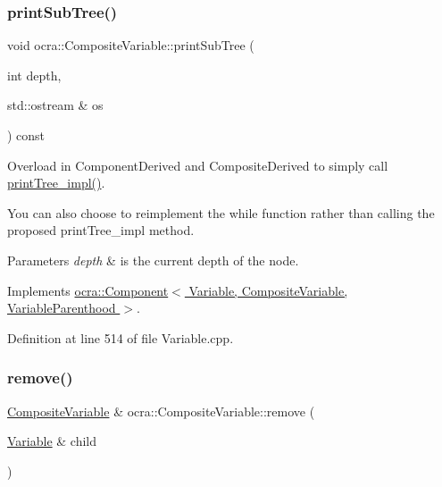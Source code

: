\subsubsection{\texorpdfstring{print\+Sub\+Tree()}{printSubTree()}}
{\footnotesize\ttfamily void ocra\+::\+Composite\+Variable\+::print\+Sub\+Tree (\begin{DoxyParamCaption}\item[{int}]{depth,  }\item[{std\+::ostream \&}]{os }\end{DoxyParamCaption}) const\hspace{0.3cm}{\ttfamily [virtual]}}



Overload in Component\+Derived and Composite\+Derived to simply call \hyperlink{classocra_1_1Composite_a99934c9b17849dd55075c4c773008dae}{print\+Tree\+\_\+impl()}. 

You can also choose to reimplement the while function rather than calling the proposed print\+Tree\+\_\+impl method. 
\begin{DoxyParams}{Parameters}
{\em depth} & is the current depth of the node. \\
\hline
\end{DoxyParams}


Implements \hyperlink{classocra_1_1Component_a3687a02c1524694fc616893264ca8199}{ocra\+::\+Component$<$ Variable, Composite\+Variable, Variable\+Parenthood $>$}.



Definition at line 514 of file Variable.\+cpp.

\hypertarget{classocra_1_1CompositeVariable_ada9e93c4f85c641e2ec8f1152c0b851a}{}\label{classocra_1_1CompositeVariable_ada9e93c4f85c641e2ec8f1152c0b851a} 
\subsubsection{\texorpdfstring{remove()}{remove()}}
{\footnotesize\ttfamily \hyperlink{classocra_1_1CompositeVariable}{Composite\+Variable} \& ocra\+::\+Composite\+Variable\+::remove (\begin{DoxyParamCaption}\item[{\hyperlink{classocra_1_1Variable}{Variable} \&}]{child }\end{DoxyParamCaption})\hspace{0.3cm}{\ttfamily [virtual]}}



